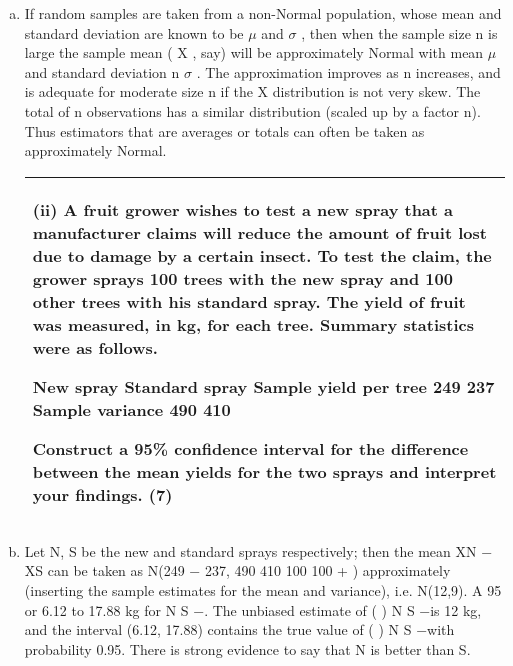 \documentclass[a4paper,12pt]{article}
\begin{document}
 
\begin{enumerate}[(a)]
\item If random samples are taken from a non-Normal population, whose mean and
standard deviation are known to be $\mu$ and $\sigma$ , then when the sample size n is large the
sample mean ( X , say) will be approximately Normal with mean $\mu$  and standard
deviation
n
$\sigma$ . The approximation improves as n increases, and is adequate for
moderate size n if the X distribution is not very skew. The total of n observations has
a similar distribution (scaled up by a factor n). Thus estimators that are averages or
totals can often be taken as approximately Normal.
\begin{table}[ht!]
 
\centering
 
\begin{tabular}{|p{15cm}|}
 
\hline  
(ii) A fruit grower wishes to test a new spray that a manufacturer claims will reduce the amount of fruit lost due to damage by a certain insect.  To test the claim, the grower sprays 100 trees with the new spray and 100 other trees with his standard spray.  The yield of fruit was measured, in kg, for each tree.  Summary statistics were as follows. 
 
 New spray Standard spray Sample yield per tree 249 237 Sample variance 490 410 
 
Construct a 95\% confidence interval for the difference between the mean yields for the two sprays and interpret your findings. (7) 
 
 

\\ \hline
  
\end{tabular}

\end{table}



\item Let N, S be the new and standard sprays respectively; then the mean XN − XS
can be taken as N(249 − 237, 490 410
100 100
+ ) approximately (inserting the sample
estimates for the mean and variance), i.e. N(12,9).
A 95%
or 6.12 to 17.88 kg for N S \mu −\mu .
The unbiased estimate of ( ) N S \mu −\mu is 12 kg, and the interval (6.12, 17.88) contains
the true value of ( ) N S \mu −\mu with probability 0.95. There is strong evidence to say
that N is better than S.
\newpage


\end{enumerate}
\end{document}

